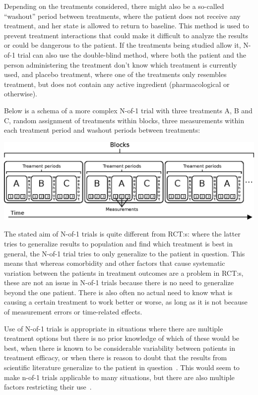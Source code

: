 \documentclass[12pt,a4paper,leqno]{report}
\theoremstyle{plain}
\theoremstyle{definition}
\theoremstyle{remark}
\begin{document}
Depending on the treatments considered, there might also be a so-called
``washout'' period between treatments, where the patient does not receive any
treatment, and her state is allowed to return to baseline. This method is used to
prevent treatment interactions that could make it difficult to analyze the
results or could be dangerous to the patient. If the treatments being studied
allow it, N-of-1 trial can also use the double-blind method, where both the patient
and the person administering the treatment don't know which treatment is currently used, and placebo
treatment, where one of the treatments only resembles treatment, but does not
contain any active ingredient (pharmacological or otherwise).

Below is a schema of a more complex N-of-1 trial with three treatments A, B and C,
random assignment of treatments within blocks, three measurements within each
treatment period and washout periods between treatments:

\bigskip
{
    \centering
    \includegraphics{n-of-1_schema.eps}
    \par
}
\bigskip

The stated aim of N-of-1 trials is quite different from RCT:s: where the latter
tries to generalize results to population and find which treatment is best in
general, the N-of-1 trial tries to only generalize to the patient in question.
This means that whereas comorbidity and other factors that cause systematic
variation between the patients in treatment outcomes are a problem in RCT:s,
these are not an issue in N-of-1 trials because there is no need to generalize
beyond the one patient. There is also often no actual need to know what is
causing a certain treatment to work better or worse, as long as it is not
because of measurement errors or time-related effects.

Use of N-of-1 trials is appropriate in situations where there are multiple
treatment options but there is no prior knowledge of which of these would be
best, when there is known to be considerable variability between patients in
treatment efficacy, or when there is reason to doubt that the results from
scientific literature generalize to the patient in question\ \cite{nofone}. This
would seem to make n-of-1 trials applicable to many situations, but there are
also multiple factors restricting their use\ \cite{nofone}.
\end{document}
